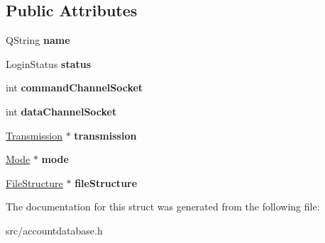 \subsection*{Public Attributes}
\begin{DoxyCompactItemize}
\item 
\mbox{\label{structAccountDatabase_1_1AccountInfo_a0231e5191b13396bb9585aad8b021624}} 
Q\+String {\bfseries name}
\item 
\mbox{\label{structAccountDatabase_1_1AccountInfo_a4b82b332d5ac94b77883ec2bcaa20030}} 
Login\+Status {\bfseries status}
\item 
\mbox{\label{structAccountDatabase_1_1AccountInfo_af53d0d93f76edcc8092558c146297d5d}} 
int {\bfseries command\+Channel\+Socket}
\item 
\mbox{\label{structAccountDatabase_1_1AccountInfo_aac8f578c342c5692edc099e6205341c2}} 
int {\bfseries data\+Channel\+Socket}
\item 
\mbox{\label{structAccountDatabase_1_1AccountInfo_a598230ee8b05e0827d767aec8abae61a}} 
\hyperlink{classTransmission}{Transmission} $\ast$ {\bfseries transmission}
\item 
\mbox{\label{structAccountDatabase_1_1AccountInfo_a0d8bf81df74545bcd28e7bc47e34e46c}} 
\hyperlink{classMode}{Mode} $\ast$ {\bfseries mode}
\item 
\mbox{\label{structAccountDatabase_1_1AccountInfo_af448b79a6f13a811408423fa9ae1c87f}} 
\hyperlink{classFileStructure}{File\+Structure} $\ast$ {\bfseries file\+Structure}
\end{DoxyCompactItemize}


The documentation for this struct was generated from the following file\+:\begin{DoxyCompactItemize}
\item 
src/accountdatabase.\+h\end{DoxyCompactItemize}
